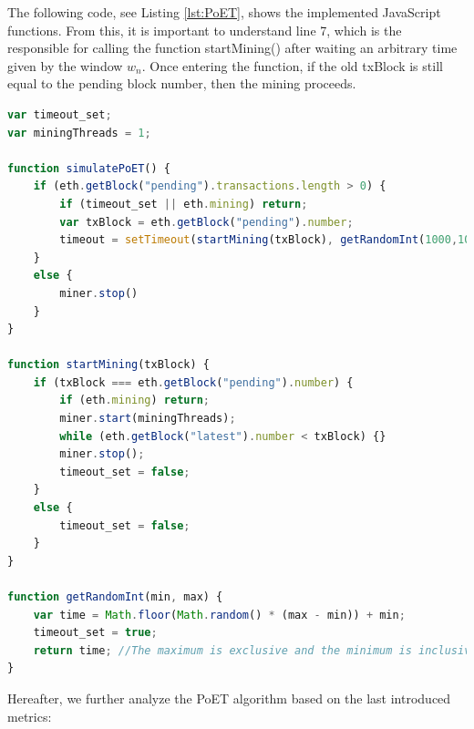 The following code, see Listing \ref{lst:PoET}, shows the implemented JavaScript functions. From this, it is important to understand line 7, which is the responsible for calling the function startMining() after waiting an arbitrary time given by the window $w_n$. Once entering the function, if the old txBlock is still equal to the pending block number, then the mining proceeds.
\newline

\begin{lstlisting}[language=JavaScript,caption={Defined functions to apply the Proof of Elapsted Time (PoET) in an Ethereum client.}, label={lst:PoET}]
var timeout_set;
var miningThreads = 1;

function simulatePoET() {
    if (eth.getBlock("pending").transactions.length > 0) {
        if (timeout_set || eth.mining) return;
        var txBlock = eth.getBlock("pending").number;
        timeout = setTimeout(startMining(txBlock), getRandomInt(1000,10000));
    }
    else {
        miner.stop()
    }
}

function startMining(txBlock) {
    if (txBlock === eth.getBlock("pending").number) {
        if (eth.mining) return;
        miner.start(miningThreads);
        while (eth.getBlock("latest").number < txBlock) {}
        miner.stop();
        timeout_set = false;
    }
    else {
        timeout_set = false;
    }
}

function getRandomInt(min, max) {
    var time = Math.floor(Math.random() * (max - min)) + min;
    timeout_set = true;
    return time; //The maximum is exclusive and the minimum is inclusive
}
\end{lstlisting}

Hereafter, we further analyze the PoET algorithm based on the last introduced metrics: 

